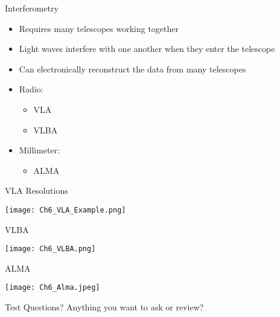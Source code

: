 \documentclass[pdf, aspectratio=169]{beamer}
\begin{document}
\begin{frame}{Interferometry}
	\begin{itemize}
		\item Requires many telescopes working together
		\item Light waves interfere with one another when they enter the telescope
		\item Can electronically reconstruct the data from many telescopes
		\item Radio:
			\begin{itemize}
				\item VLA
				\item VLBA
			\end{itemize}
		\item Millimeter:
			\begin{itemize}
				\item ALMA
			\end{itemize}
	\end{itemize}
\end{frame}

\begin{frame}{VLA Resolutions}
	\begin{center}
		\texttt{[image: Ch6\_VLA\_Example.png]}
	\end{center}
\end{frame}

\begin{frame}{VLBA}
	\begin{center}
		\texttt{[image: Ch6\_VLBA.png]}
	\end{center}
\end{frame}

\begin{frame}{ALMA}
	\begin{center}
		\texttt{[image: Ch6\_Alma.jpeg]}
	\end{center}
\end{frame}

\begin{frame}{Test Questions?}
	Anything you want to ask or review?
\end{frame}

	
\end{document}
